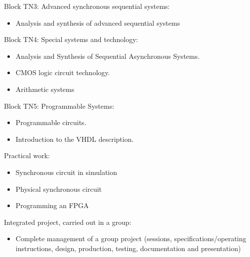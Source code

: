 Block TN3: Advanced synchronous sequential systems:
\begin{itemize}
    \item Analysis and synthesis of advanced sequential systems
\end{itemize}
Block TN4: Special systems and technology:
\begin{itemize}
    \item Analysis and Synthesis of Sequential Asynchronous Systems.
    \item CMOS logic circuit technology.
    \item Arithmetic systems
\end{itemize}
Block TN5: Programmable Systems:
\begin{itemize}
    \item Programmable circuits.
    \item Introduction to the VHDL description.
\end{itemize}
Practical work:
\begin{itemize}
    \item Synchronous circuit in simulation
    \item Physical synchronous circuit
    \item Programming an FPGA
\end{itemize}
Integrated project, carried out in a group:
\begin{itemize}
    \item Complete management of a group project (sessions, specifications/operating instructions, design, production, testing, documentation and presentation)
\end{itemize}